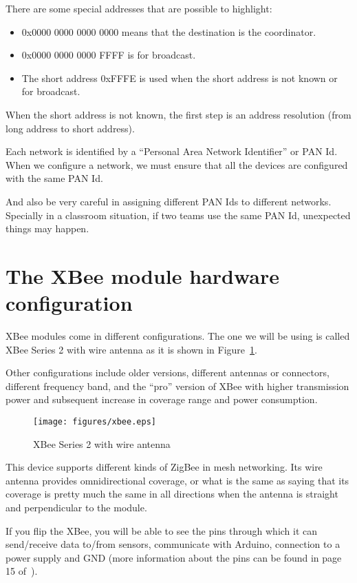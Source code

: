 There are some special addresses that are possible to highlight:
\begin{itemize}
	\item 0x0000 0000 0000 0000 means that the destination is the coordinator.
	\item 0x0000 0000 0000 FFFF is for broadcast.
	\item The short address 0xFFFE is used when the short address is not known or for broadcast.
\end{itemize}

When the short address is not known, the first step is an address resolution (from long address to short address).

Each network is identified by a ``Personal Area Network Identifier'' or PAN Id.
When we configure a network, we must ensure that all the devices are configured with the same PAN Id. 

And also be very careful in assigning different PAN Ids to different networks.
Specially in a classroom situation, if two teams use the same PAN Id, unexpected things may happen.


\section{The XBee module hardware configuration}\label{xbee:hardware}

XBee modules come in different configurations. The one we will be using is called XBee Series 2 with wire antenna as it is shown in Figure~\ref{fig:xbee}.

Other configurations include older versions, different antennas or connectors, different frequency band, and the ``pro'' version of XBee with higher transmission power and subsequent increase in coverage range and power consumption.


\begin{figure}[htbp]
  \centering
  \texttt{[image: figures/xbee.eps]}
  \caption{XBee Series 2 with wire antenna
  \label{fig:xbee}}
\end{figure}

This device supports different kinds of ZigBee in mesh networking. Its wire antenna provides omnidirectional coverage, or what is the same as saying that its coverage is pretty much the same in all directions when the antenna is straight and perpendicular to the module.

If you flip the XBee, you will be able to see the pins through which it can send/receive data to/from sensors, communicate with Arduino, connection to a power supply and GND (more information about the pins can be found in page 15 of~\cite{faludi2010bws}).


